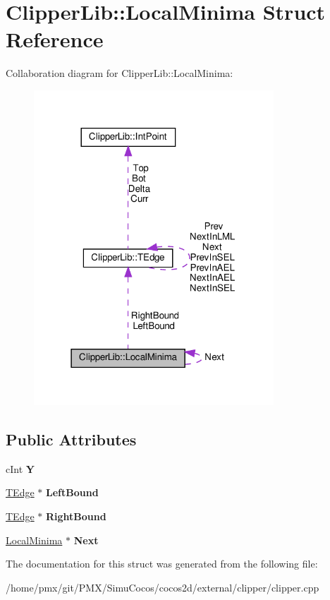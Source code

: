 \hypertarget{structClipperLib_1_1LocalMinima}{}\section{Clipper\+Lib\+:\+:Local\+Minima Struct Reference}
\label{structClipperLib_1_1LocalMinima}


Collaboration diagram for Clipper\+Lib\+:\+:Local\+Minima\+:
\nopagebreak
\begin{figure}[H]
\begin{center}
\leavevmode
\includegraphics[width=255pt]{structClipperLib_1_1LocalMinima__coll__graph}
\end{center}
\end{figure}
\subsection*{Public Attributes}
\begin{DoxyCompactItemize}
\item 
\mbox{\label{structClipperLib_1_1LocalMinima_a623ff23e169e8fb8ebae6683226b183c}} 
c\+Int {\bfseries Y}
\item 
\mbox{\label{structClipperLib_1_1LocalMinima_ac12957b2c769be2252cc43b74d7da077}} 
\hyperlink{structClipperLib_1_1TEdge}{T\+Edge} $\ast$ {\bfseries Left\+Bound}
\item 
\mbox{\label{structClipperLib_1_1LocalMinima_ab472ec269c5408d5b11abd09a04f6dc2}} 
\hyperlink{structClipperLib_1_1TEdge}{T\+Edge} $\ast$ {\bfseries Right\+Bound}
\item 
\mbox{\label{structClipperLib_1_1LocalMinima_a0d7a49d14a39d7dba3ddd28fc8a90a1e}} 
\hyperlink{structClipperLib_1_1LocalMinima}{Local\+Minima} $\ast$ {\bfseries Next}
\end{DoxyCompactItemize}


The documentation for this struct was generated from the following file\+:\begin{DoxyCompactItemize}
\item 
/home/pmx/git/\+P\+M\+X/\+Simu\+Cocos/cocos2d/external/clipper/clipper.\+cpp\end{DoxyCompactItemize}
